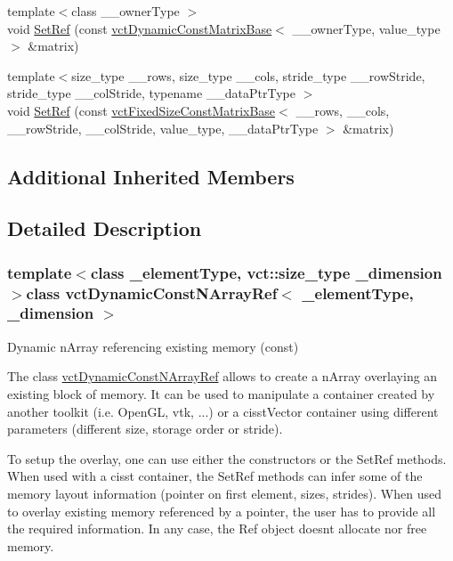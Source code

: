 \begin{DoxyCompactItemize}
\item 
{\footnotesize template$<$class \+\_\+\+\_\+owner\+Type $>$ }\\void \hyperlink{classvct_dynamic_const_n_array_ref_a563ed48cec7d06b19455ef3806996c59}{Set\+Ref} (const \hyperlink{classvct_dynamic_const_matrix_base}{vct\+Dynamic\+Const\+Matrix\+Base}$<$ \+\_\+\+\_\+owner\+Type, value\+\_\+type $>$ \&matrix)
\item 
{\footnotesize template$<$size\+\_\+type \+\_\+\+\_\+rows, size\+\_\+type \+\_\+\+\_\+cols, stride\+\_\+type \+\_\+\+\_\+row\+Stride, stride\+\_\+type \+\_\+\+\_\+col\+Stride, typename \+\_\+\+\_\+data\+Ptr\+Type $>$ }\\void \hyperlink{classvct_dynamic_const_n_array_ref_a81f94505fe95d71453fde0a53f12b7aa}{Set\+Ref} (const \hyperlink{classvct_fixed_size_const_matrix_base}{vct\+Fixed\+Size\+Const\+Matrix\+Base}$<$ \+\_\+\+\_\+rows, \+\_\+\+\_\+cols, \+\_\+\+\_\+row\+Stride, \+\_\+\+\_\+col\+Stride, value\+\_\+type, \+\_\+\+\_\+data\+Ptr\+Type $>$ \&matrix)
\end{DoxyCompactItemize}
\subsection*{Additional Inherited Members}


\subsection{Detailed Description}
\subsubsection*{template$<$class \+\_\+element\+Type, vct\+::size\+\_\+type \+\_\+dimension$>$class vct\+Dynamic\+Const\+N\+Array\+Ref$<$ \+\_\+element\+Type, \+\_\+dimension $>$}

Dynamic n\+Array referencing existing memory (const) 

The class \hyperlink{classvct_dynamic_const_n_array_ref}{vct\+Dynamic\+Const\+N\+Array\+Ref} allows to create a n\+Array overlaying an existing block of memory. It can be used to manipulate a container created by another toolkit (i.\+e. Open\+G\+L, vtk, ...) or a cisst\+Vector container using different parameters (different size, storage order or stride).

To setup the overlay, one can use either the constructors or the Set\+Ref methods. When used with a cisst container, the Set\+Ref methods can infer some of the memory layout information (pointer on first element, sizes, strides). When used to overlay existing memory referenced by a pointer, the user has to provide all the required information. In any case, the Ref object doesn\textquotesingle{}t allocate nor free memory.

